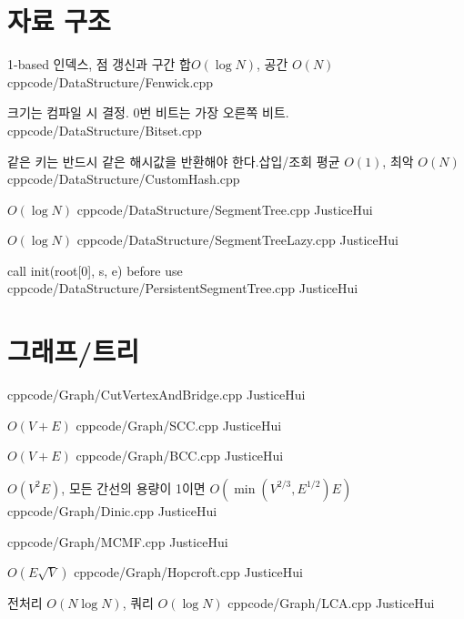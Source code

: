 \documentclass[landscape, 8pt, a4paper, twocolumn]{extarticle} %
\begin{document}
\maketitlepage

\pagebreak 

\section{자료 구조}

{1-based 인덱스, 점 갱신과 구간 합}{$O(\log N)$, 공간 $O(N)$}
{cpp}{code/DataStructure/Fenwick.cpp}
{}

{크기는 컴파일 시 결정. 0번 비트는 가장 오른쪽 비트.}{}
{cpp}{code/DataStructure/Bitset.cpp}
{}

{같은 키는 반드시 같은 해시값을 반환해야 한다.}{삽입/조회 평균 $O(1)$, 최악 $O(N)$}
{cpp}{code/DataStructure/CustomHash.cpp}
{}

{}{$O(\log N)$}
{cpp}{code/DataStructure/SegmentTree.cpp}
{JusticeHui}

{}{$O(\log N)$}
{cpp}{code/DataStructure/SegmentTreeLazy.cpp}
{JusticeHui}

{call init(root[0], s, e) before use}{}
{cpp}{code/DataStructure/PersistentSegmentTree.cpp}
{JusticeHui}

\section{그래프/트리}

{}{}
{cpp}{code/Graph/CutVertexAndBridge.cpp}
{JusticeHui}

{}{$O(V+E)$}
{cpp}{code/Graph/SCC.cpp}
{JusticeHui}

{}{$O(V+E)$}
{cpp}{code/Graph/BCC.cpp}
{JusticeHui}

{}{$O(V^2E)$, 모든 간선의 용량이 1이면 $O(\min(V^{2/3},E^{1/2})E)$}
{cpp}{code/Graph/Dinic.cpp}
{JusticeHui}

{}{}
{cpp}{code/Graph/MCMF.cpp}
{JusticeHui}

{}{$O(E \sqrt V)$}
{cpp}{code/Graph/Hopcroft.cpp}
{JusticeHui}

{}{전처리 $O(N \log N)$, 쿼리 $O(\log N)$}
{cpp}{code/Graph/LCA.cpp}
{JusticeHui}
\end{document}
